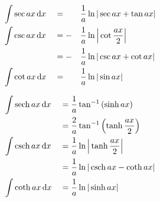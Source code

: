 \begin{myminipage}[t]{0.5\linewidth}
    \begin{HackEquationLeftAlign}
    \begin{alignat*}{3}
        &\int{\sec{ax} \,\diff{x}} &&= && \frac{1}{a} \ln{\abs{\sec{ax} + \tan{ax}}} \\
        &\int{\csc{ax} \,\diff{x}} &&= -&& \frac{1}{a} \ln{\abs*{\cot{\frac{ax}{2}}}} \\
        & &&= -&& \frac{1}{a} \ln{\abs{\csc{ax} + \cot{ax}}} \\
        &\int{\cot{ax} \,\diff{x}} &&= && \frac{1}{a} \ln{\abs{\sin{ax}}}
    \end{alignat*}
    \end{HackEquationLeftAlign}%
\end{myminipage}%
\begin{myminipage}[t]{0.5\linewidth}
    \begin{HackEquationLeftAlign}
    \begin{alignat*}{3}
        &\int{\sech{ax} \,\diff{x}} &&= \frac{1}{a} \tan^{-1}{\parens*{\sinh{ax}}} \\
        & &&= \frac{2}{a} \tan^{-1}{\parens*{\tanh{\frac{ax}{2}}}} \\
        &\int{\csch{ax} \,\diff{x}} &&= \frac{1}{a} \ln{\abs*{\tanh{\frac{ax}{2}}}} \\
        & &&= \frac{1}{a} \ln{\abs*{\csch{ax} - \coth{ax}}} \\
        &\int{\coth{ax} \,\diff{x}} &&= \frac{1}{a} \ln{\abs*{\sinh{ax}}}
    \end{alignat*}
    \end{HackEquationLeftAlign}%
\end{myminipage}


